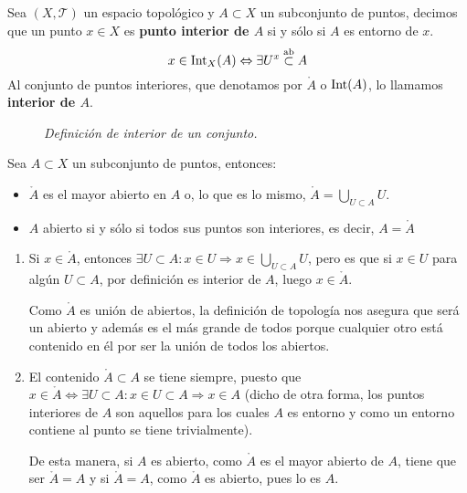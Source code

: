\begin{defi}
Sea $(X,\mathcal{T})$ un espacio topológico y $A \subset X$ un subconjunto de puntos, decimos que un punto $x\in X$ es \textbf{punto interior de $A$} si y sólo si $A$ es entorno de $x$.
$$
x\in \operatorname{Int}_X(A) \Leftrightarrow \exists U^x \stackrel{\text{ab}}{\subset} A
$$
Al conjunto de puntos interiores, que denotamos por $\mathring{A}$ o $\operatorname{Int}(A)$, lo llamamos \textbf{interior de $A$}.
\end{defi}

\begin{figure}[H]
    \centering
    \caption{\textit{Definición de interior de un conjunto.}}
    \label{fig:definición-interior}
\end{figure}

\begin{prop}
Sea $A\subset X$ un subconjunto de puntos, entonces:
\begin{itemize}
\item $\mathring{A}$ es el mayor abierto en $A$ o, lo que es lo mismo, $ \mathring{A} = \bigcup_{U \subset A} U$.
\item $A$ abierto si y sólo si todos sus puntos son interiores, es decir, $A = \mathring{A}$
\end{itemize}
\end{prop}
\begin{demo}
\begin{enumerate}
    \item Si $x\in \mathring{A}$, entonces $\exists U \subset A : x\in U \Rightarrow x\in \bigcup_{U\subset A}U$, pero es que si $x\in U$ para algún $U\subset A$, por definición es interior de $A$, luego $x\in \mathring{A}$.
   
   Como $\mathring{A}$ es unión de abiertos, la definición de topología nos asegura que será un abierto y además es el más grande de todos porque cualquier otro está contenido en él por ser la unión de todos los abiertos.   
   \item El contenido $\mathring{A}\subset A$ se tiene siempre, puesto que $x\in \mathring{A}\Leftrightarrow \exists U \subset A : x\in U \subset A \Rightarrow x\in A$ (dicho de otra forma, los puntos interiores de $A$ son aquellos para los cuales $A$ es entorno y como un entorno contiene al punto se tiene trivialmente).
   
   De esta manera, si $A$ es abierto, como $\mathring{A}$ es el mayor abierto de $A$, tiene que ser $\mathring{A} = A$ y si $\mathring{A} = A$, como $\mathring{A}$ es abierto, pues lo es $A$.
\end{enumerate}
\end{demo}

